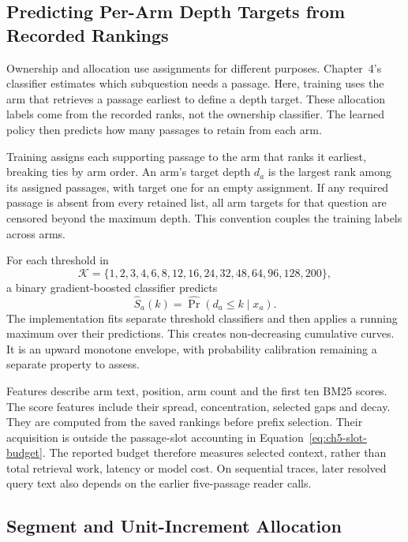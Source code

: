 \subsection{Predicting Per-Arm Depth Targets from Recorded Rankings}

Ownership and allocation use assignments for different purposes. Chapter~4's
classifier estimates which subquestion needs a passage. Here, training uses
the arm that retrieves a passage earliest to define a depth target. These
allocation labels come from the recorded ranks, not the ownership classifier.
The learned policy then predicts how many passages to retain from each arm.

Training assigns each supporting passage to the arm that ranks it earliest,
breaking ties by arm order. An arm's target depth $d_a$ is the largest rank
among its assigned passages, with target one for an empty assignment. If
any required passage is absent from every retained list, all arm targets
for that question are censored beyond the maximum depth. This convention
couples the training labels across arms.

For each threshold in
\[
  \mathcal K=\{1,2,3,4,6,8,12,16,24,32,48,64,96,128,200\},
\]
a binary gradient-boosted classifier predicts
\begin{equation}
  \widehat S_a(k)=\widehat{\Pr}(d_a\leq k\mid x_a).
  \label{eq:ch5-depth-cdf}
\end{equation}
The implementation fits separate threshold classifiers and then applies a
running maximum over their predictions. This creates non-decreasing
cumulative curves. It is an upward monotone envelope, with probability
calibration remaining a separate property to assess.

Features describe arm text, position, arm count and the first ten BM25
scores. The score features include their spread, concentration, selected
gaps and decay. They are computed from the saved rankings before prefix
selection. Their acquisition is outside the passage-slot accounting in
Equation~\ref{eq:ch5-slot-budget}. The reported budget therefore measures
selected context, rather than total retrieval work, latency or model cost.
On sequential traces, later resolved query text also depends on the earlier
five-passage reader calls.

\subsection{Segment and Unit-Increment Allocation}

